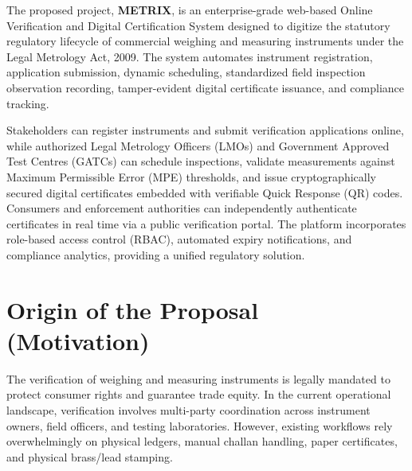 \documentclass[11pt,a4paper]{article}
\begin{document}
\vspace{0.1cm}

\begin{tcolorbox}[
    enhanced,
    colback=lightslate,
    colframe=primarynavy,
    leftrule=4mm,
    rightrule=0.6pt,
    toprule=0.6pt,
    bottomrule=0.6pt,
    arc=1.5mm,
    title={\textbf{\color{white}\large Executive Project Summary}},
    coltitle=white,
    colbacktitle=primarynavy
]
The proposed project, \textbf{METRIX}, is an enterprise-grade web-based Online Verification and Digital Certification System designed to digitize the statutory regulatory lifecycle of commercial weighing and measuring instruments under the Legal Metrology Act, 2009. The system automates instrument registration, application submission, dynamic scheduling, standardized field inspection observation recording, tamper-evident digital certificate issuance, and compliance tracking. 

Stakeholders can register instruments and submit verification applications online, while authorized Legal Metrology Officers (LMOs) and Government Approved Test Centres (GATCs) can schedule inspections, validate measurements against Maximum Permissible Error (MPE) thresholds, and issue cryptographically secured digital certificates embedded with verifiable Quick Response (QR) codes. Consumers and enforcement authorities can independently authenticate certificates in real time via a public verification portal. The platform incorporates role-based access control (RBAC), automated expiry notifications, and compliance analytics, providing a unified regulatory solution.
\end{tcolorbox}

\vspace{0.2cm}

\section{Origin of the Proposal (Motivation)}
The verification of weighing and measuring instruments is legally mandated to protect consumer rights and guarantee trade equity. In the current operational landscape, verification involves multi-party coordination across instrument owners, field officers, and testing laboratories. However, existing workflows rely overwhelmingly on physical ledgers, manual challan handling, paper certificates, and physical brass/lead stamping. 
\end{document}
